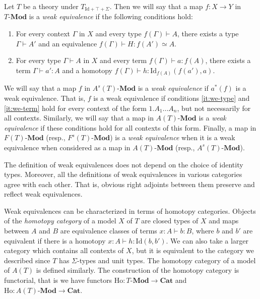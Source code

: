 \documentclass[reqno]{amsart}
\theoremstyle{definition}
\theoremstyle{remark}
\newcommand{\fs}[1]{\mathrm{#1}}
\newcommand{\bcat}[1]{\mathbf{#1}}
\newcommand{\Mod}[1]{#1\text{-}\bcat{Mod}}
\numberwithin{figure}{section}
\begin{document}
Let $T$ be a theory under $T_{\fs{Id} + \top + \Sigma}$.
Then we will say that a map $f : X \to Y$ in $\Mod{T}$ is a \emph{weak equivalence} if the following conditions hold:
\begin{enumerate}
\item \label{it:we-type} For every context $\Gamma$ in $X$ and every type $f(\Gamma) \vdash A$, there exists a type $\Gamma \vdash A'$ and an equivalence $f(\Gamma) \vdash H : f(A') \simeq A$.
\item \label{it:we-term} For every type $\Gamma \vdash A$ in $X$ and every term $f(\Gamma) \vdash a : f(A)$, there exists a term $\Gamma \vdash a' : A$ and a homotopy $f(\Gamma) \vdash h : \fs{Id}_{f(A)}(f(a'),a)$.
\end{enumerate}

We will say that a map $f$ in $\Mod{A^s(T)}$ is a \emph{weak equivalence} if $a^*(f)$ is a weak equivalence.
That is, $f$ is a weak equivalence if conditions \eqref{it:we-type} and \eqref{it:we-term} hold for every context of the form $1.A_1 \ldots A_n$, but not necessarily for all contexts.
Similarly, we will say that a map in $\Mod{A(T)}$ is a \emph{weak equivalence} if these conditions hold for all contexts of this form.
Finally, a map in $\Mod{F(T)}$ (resp., $\Mod{F^s(T)}$) is a \emph{weak equivalence} when it is a weak equivalence when considered as a map in $\Mod{A(T)}$ (resp., $\Mod{A^s(T)}$).

\begin{remark}[std-we]
The definition of weak equivalences does not depend on the choice of identity types.
Moreover, all the definitions of weak equivalences in various categories agree with each other.
That is, obvious right adjoints between them preserve and reflect weak equivalences.
\end{remark}

Weak equivalences can be characterized in terms of homotopy categories.
Objects of the \emph{homotopy category} of a model $X$ of $T$ are closed types of $X$ and maps between $A$ and $B$ are equivalence classes of terms $x : A \vdash b : B$,
where $b$ and $b'$ are equivalent if there is a homotopy $x : A \vdash h : \fs{Id}(b,b')$.
We can also take a larger category which contains all contexts of $X$, but it is equivalent to the category we described since $T$ has $\Sigma$-types and unit types.
The homotopy category of a model of $A(T)$ is defined similarly.
The construction of the homotopy category is functorial, that is we have functors $\fs{Ho} : \Mod{T} \to \bcat{Cat}$ and $\fs{Ho} : \Mod{A(T)} \to \bcat{Cat}$.
\end{document}
